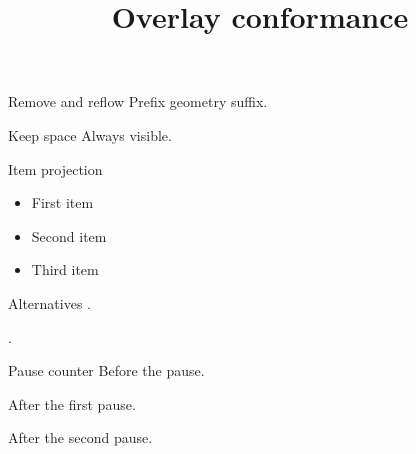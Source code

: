 \documentclass[aspectratio=169]{beamer}
\title{Overlay conformance}
\date{}
\begin{document}
\begin{frame}{Remove and reflow}
  Prefix geometry  suffix.
\end{frame}

\begin{frame}{Keep space}
  Always visible.

\end{frame}

\begin{frame}{Item projection}
  \begin{itemize}[<+->]
    \item First item
    \item Second item
    \item Third item
  \end{itemize}
\end{frame}

\begin{frame}{Alternatives}
  .

  .

\end{frame}

\begin{frame}{Pause counter}
  Before the pause.

  \pause
  After the first pause.

  \pause
  After the second pause.
\end{frame}
\end{document}
